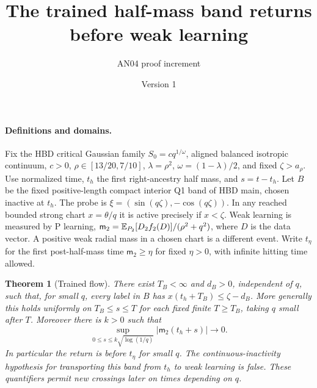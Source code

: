 \documentclass[11pt]{article}
\title{The trained half-mass band returns before weak learning}
\author{AN04 proof increment}\date{Version 1}
\newtheorem{theorem}{Theorem}\newtheorem{lemma}{Lemma}
\begin{document}
\maketitle

\paragraph{Definitions and domains.}
Fix the HBD critical Gaussian family $S_0=cq^{1/\omega}$, aligned
balanced isotropic continuum, $c>0$, $\rho\in[13/20,7/10]$,
$\lambda=\rho^2$, $\omega=(1-\lambda)/2$, and fixed $\zeta>a_\rho$.
Use normalized time, $t_h$ the first right-ancestry half mass, and
$s=t-t_h$. Let $B$ be the fixed positive-length compact interior Q1
band of HBD main, chosen inactive at $t_h$.
The probe is $\xi=(\sin(q\zeta),-\cos(q\zeta))$. In any reached
bounded strong chart $x=\theta/q$ it is active precisely if $x<\zeta$.
Weak learning is measured by P learning,
$\mathsf m_2=\mathbb E_{P_2}[D_2 f_2(D)]/(\rho^2+q^2)$,
where $D$ is the data vector. A positive weak radial mass in a
chosen chart is a different event. Write $t_\eta$ for the first
post-half-mass time $\mathsf m_2\ge\eta$ for fixed $\eta>0$, with
infinite hitting time allowed.

\begin{theorem}[Trained flow]\label{an04brwv1:return}
There exist $T_B<\infty$ and $d_B>0$, independent of $q$, such that,
for small $q$, every label in $B$ has $x(t_h+T_B)\le\zeta-d_B$.
More generally this holds uniformly on $T_B\le s\le T$ for each
fixed finite $T\ge T_B$, taking $q$ small after $T$. Moreover there
is $k>0$ such that
\[
 \sup_{0\le s\le k\sqrt{\log(1/q)}}|\mathsf m_2(t_h+s)|\longrightarrow0.
\]
In particular the return is before $t_\eta$ for small $q$. The
continuous-inactivity hypothesis for transporting this band from
$t_h$ to weak learning is false. These quantifiers permit new
crossings later on times depending on $q$.
\end{theorem}
\end{document}
